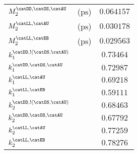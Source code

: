 \begin{table}[htb]
\begin{tabular}{llr@{$\,\pm\,$}l}
  $M_2^\text{\catDD,\catOS,\catAU}$              & ($\si{\pico\second}$) & \multicolumn{2}{c}{$0.064157$}\\
  $M_2^\text{\catLL,\catAU}$                     & ($\si{\pico\second}$) & \multicolumn{2}{c}{$0.030178$}\\
  $M_2^\text{\catLL,\catEB}$                     & ($\si{\pico\second}$) & \multicolumn{2}{c}{$0.029563$}\\
  $k_1^\text{\catDD,!(\catOS,\catAU)}$           &                       & \multicolumn{2}{c}{$0.73464$}\\
  $k_1^\text{\catDD,\catOS,\catAU}$              &                       & \multicolumn{2}{c}{$0.72987$}\\
  $k_1^\text{\catLL,\catAU}$                     &                       & \multicolumn{2}{c}{$0.69218$}\\
  $k_1^\text{\catLL,\catEB}$                     &                       & \multicolumn{2}{c}{$0.59111$}\\
  $k_2^\text{\catDD,!(\catOS,\catAU)}$           &                       & \multicolumn{2}{c}{$0.68463$}\\
  $k_2^\text{\catDD,\catOS,\catAU}$              &                       & \multicolumn{2}{c}{$0.67792$}\\
  $k_2^\text{\catLL,\catAU}$                     &                       & \multicolumn{2}{c}{$0.77259$}\\
  $k_2^\text{\catLL,\catEB}$                     &                       & \multicolumn{2}{c}{$0.78276$}\\
  \bottomrule
\end{tabular}
\end{table}
%
